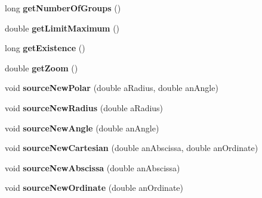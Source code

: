 \begin{DoxyCompactItemize}
\item 
\hypertarget{class_sources_manager_afdd27b9252d51a831a1722f707e869df}{long {\bfseries get\-Number\-Of\-Groups} ()}\label{class_sources_manager_afdd27b9252d51a831a1722f707e869df}

\item 
\hypertarget{class_sources_manager_a66db32a744b2261c4d74c19eda5713d1}{double {\bfseries get\-Limit\-Maximum} ()}\label{class_sources_manager_a66db32a744b2261c4d74c19eda5713d1}

\item 
\hypertarget{class_sources_manager_aa2433e5fe0d82d8120d3c3ad4cc2f635}{long {\bfseries get\-Existence} ()}\label{class_sources_manager_aa2433e5fe0d82d8120d3c3ad4cc2f635}

\item 
\hypertarget{class_sources_manager_abfc3a1582e8f9f6b43ff14631496c42b}{double {\bfseries get\-Zoom} ()}\label{class_sources_manager_abfc3a1582e8f9f6b43ff14631496c42b}

\item 
\hypertarget{class_sources_manager_a8e1c298ba407838f8081c20a0971db8e}{void {\bfseries source\-New\-Polar} (double a\-Radius, double an\-Angle)}\label{class_sources_manager_a8e1c298ba407838f8081c20a0971db8e}

\item 
\hypertarget{class_sources_manager_a44f61fd0a7a770dc9fa687d67901e4f2}{void {\bfseries source\-New\-Radius} (double a\-Radius)}\label{class_sources_manager_a44f61fd0a7a770dc9fa687d67901e4f2}

\item 
\hypertarget{class_sources_manager_a73c76181cfeebaf31e9509a187a20b43}{void {\bfseries source\-New\-Angle} (double an\-Angle)}\label{class_sources_manager_a73c76181cfeebaf31e9509a187a20b43}

\item 
\hypertarget{class_sources_manager_a017d0d834d3ab4b28e7e4278e08ce86e}{void {\bfseries source\-New\-Cartesian} (double an\-Abscissa, double an\-Ordinate)}\label{class_sources_manager_a017d0d834d3ab4b28e7e4278e08ce86e}

\item 
\hypertarget{class_sources_manager_a679febdd0f1a4c4ae8d16b53a16ad5b5}{void {\bfseries source\-New\-Abscissa} (double an\-Abscissa)}\label{class_sources_manager_a679febdd0f1a4c4ae8d16b53a16ad5b5}

\item 
\hypertarget{class_sources_manager_ac33b4afd152401cca64e5146480b9a17}{void {\bfseries source\-New\-Ordinate} (double an\-Ordinate)}\label{class_sources_manager_ac33b4afd152401cca64e5146480b9a17}


\end{DoxyCompactItemize}
